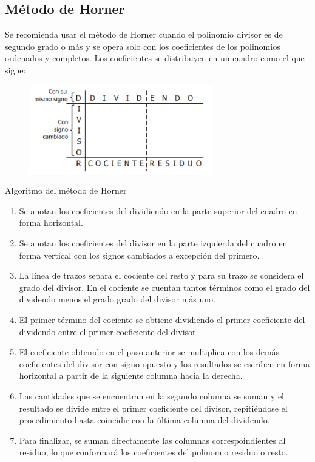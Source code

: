 \subsection{Método de Horner}

Se recomienda usar el método de Horner cuando el polinomio divisor es de segundo grado o más y se opera solo con
los coeficientes de los polinomios ordenados y completos.
Los coeficientes se distribuyen en un cuadro como el que sigue:
\begin{figure}[htb]
    \centering
    \includegraphics[width=8cm]{images/metodo-de-horner}
\end{figure}

Algoritmo del método de Horner
\begin{enumerate}
    \item Se anotan los coeficientes del dividiendo en la parte superior del cuadro en forma horizontal.
    \item Se anotan los coeficientes del divisor en la parte izquierda del cuadro en forma vertical con los signos cambiados a excepción del primero.
    \item La línea de trazos separa el cociente del resto y para su trazo se considera el grado del divisor.
    En el cociente se cuentan tantos términos como el grado del dividendo menos el grado grado del divisor más uno.
    \item El primer término del cociente se obtiene dividiendo el primer coeficiente del dividendo entre el primer coeficiente del divisor.
    \item El coeficiente obtenido en el paso anterior se multiplica con los demás coeficientes del divisor con signo opuesto y los resultados se escriben en forma horizontal a partir de la siguiente columna hacía la derecha.
    \item Las cantidades que se encuentran en la segundo columna se suman y el resultado se divide entre el primer coeficiente del divisor, repitiéndose el procedimiento hasta coincidir con la última columna del dividendo.
    \item Para finalizar, se suman directamente las columnas correspoindientes al residuo, lo que conformará los coeficientes del polinomio residuo o resto.
\end{enumerate}




